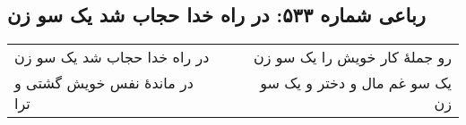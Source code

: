\begin{center}
\section*{رباعی شماره ۵۳۳: در راه خدا حجاب شد یک سو زن}
\label{sec:sh533}
\begin{longtable}{l p{0.5cm} r}
در راه خدا حجاب شد یک سو زن
&&
رو جملهٔ کار خویش را یک سو زن
\\
در ماندهٔ نفس خویش گشتی و ترا
&&
یک سو غم مال و دختر و یک سو زن
\\
\end{longtable}
\end{center}
